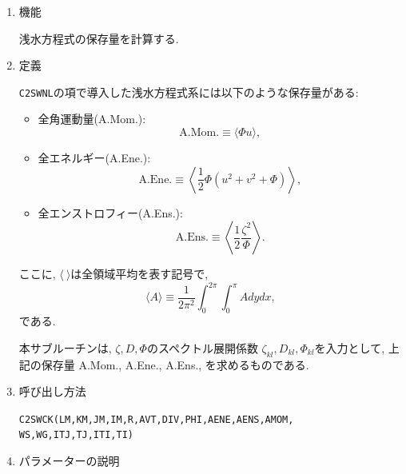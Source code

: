 \documentclass[a4j,fleqn]{jarticle}
\begin{document}
\begin{enumerate}

\item 機能

浅水方程式の保存量を計算する.

\item 定義

{\tt C2SWNL}の項で導入した浅水方程式系には以下のような保存量がある:
\begin{itemize}
\item 全角運動量(A.Mom.):
\begin{equation}
\mbox{A.Mom.}\equiv\langle\Phi u\rangle,
\end{equation}
\item 全エネルギー(A.Ene.):
\begin{equation}
\mbox{A.Ene.}\equiv\left\langle\frac12\Phi(u^2+v^2+\Phi)\right\rangle,
\end{equation}
\item 全エンストロフィー(A.Ens.):
\begin{equation}
\mbox{A.Ens.}\equiv\left\langle\frac12\frac{\zeta^2}{\Phi}\right\rangle.
\end{equation}
\end{itemize}
ここに, $\langle\ \rangle$は全領域平均を表す記号で,
\begin{equation}
\langle A\rangle\equiv\frac1{2\pi^2}\int^{2\pi}_0\int^{\pi}_0 A dy dx,
\end{equation}
である.

本サブルーチンは, $\zeta,D,\Phi$のスペクトル展開係数
$\zeta_{kl},D_{kl},\Phi_{kl}$を入力として, 
上記の保存量 A.Mom., A.Ene., A.Ens.,
を求めるものである.

\item 呼び出し方法 

{\tt C2SWCK(LM,KM,JM,IM,R,AVT,DIV,PHI,AENE,AENS,AMOM,
WS,WG,ITJ,TJ,ITI,TI)}
  
\item パラメーターの説明


\end{enumerate}
\end{document}
